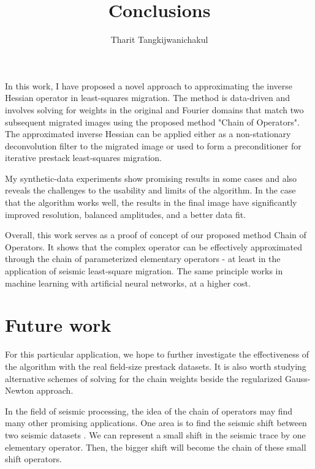 \title{Conclusions}
\author{Tharit Tangkijwanichakul}
\label{ch:chapter-conclusion}

\maketitle



In this work, I have proposed a novel approach to approximating the inverse Hessian operator in least-squares migration. The method is data-driven and involves solving for weights in the original and Fourier domains that match two subsequent migrated images using the proposed method "Chain of Operators". The approximated inverse Hessian can be applied either as a non-stationary deconvolution filter to the migrated image or used to form a preconditioner for iterative prestack least-squares migration.

 My synthetic-data experiments show promising results in some cases and also reveals the challenges to the usability and limits of the algorithm. In the case that the algorithm works well, the results in the final image have significantly improved resolution, balanced amplitudes, and a better data fit.

 Overall, this work serves as a proof of concept of our proposed method Chain of Operators. It shows that the complex operator can be effectively approximated through the chain of parameterized elementary operators - at least in the application of seismic least-square migration. The same principle works in machine learning with artificial neural networks, at a higher cost.



\section{Future work}
For this particular application, we hope to further investigate the effectiveness of the algorithm with the real field-size prestack datasets. It is also worth studying alternative schemes of solving for the chain weights beside the regularized Gauss-Newton approach.

In the field of seismic processing, the idea of the chain of operators may find many other promising applications. One area is to find the seismic shift between two seismic datasets \cite[]{liner2004nonlinear}. We can represent a small shift in the seismic trace by one elementary operator. Then, the bigger shift will become the chain of these small shift operators.


